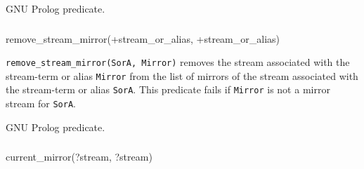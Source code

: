 GNU Prolog predicate.

\subsubsection{\label{remove-stream-mirror/2}}

\begin{TemplatesOneCol}
remove\_stream\_mirror(+stream\_or\_alias, +stream\_or\_alias)

\end{TemplatesOneCol}

\Description

\texttt{remove\_stream\_mirror(SorA, Mirror)} removes the stream associated
with the stream-term or alias \texttt{Mirror} from the list of mirrors of the
stream associated with the stream-term or alias \texttt{SorA}. This predicate
fails if \texttt{Mirror} is not a mirror stream for \texttt{SorA}.

\begin{PlErrors}







\end{PlErrors}

\Portability

GNU Prolog predicate.

\subsubsection{}

\begin{TemplatesOneCol}
current\_mirror(?stream, ?stream)

\end{TemplatesOneCol}

